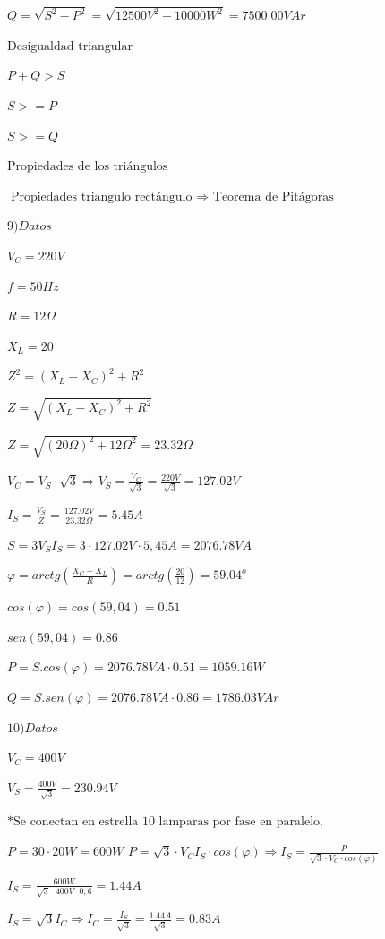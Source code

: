 $Q=\sqrt{S^2-P^2}=\sqrt{12500V^2-10000W^2} = 7500.00VAr$

$\text{Desigualdad triangular}$

$P+Q>S$

$S>=P$

$S>=Q$

$\text{Propiedades de los triángulos}$

$\text{Propiedades triangulo rectángulo $\Rightarrow$ Teorema de Pitágoras}$

\vspace{1cm}

$9) Datos$

$V_C=220V$

$f=50Hz$

$R=12 \Omega$

$X_L=20$

$Z^2=(X_L-X_C)^2+R^2 $

$Z=\sqrt{(X_L-X_C)^2+R^2} $

$Z=\sqrt{(20\Omega)^2+12\Omega^2} = 23.32\Omega$

$V_C=V_S \cdot \sqrt{3}\Rightarrow V_S=\frac{V_C}{ \sqrt{3}} =\frac{220V}{\sqrt{3}}=127.02V$

$I_S=\frac{V_S}{Z}=\frac{127.02V}{23.32\Omega}=5.45A$

$S=3 V_S I_S=3 \cdot 127.02V \cdot 5,45A=2076.78VA$

$\varphi = arctg(\frac{X_C-X_L}{R})= arctg(\frac{20}{12})=59.04^o$

$cos(\varphi) = cos(59,04)=0.51$

$sen(59,04)=0.86$

$P=S.cos(\varphi)=2076.78VA \cdot 0.51=1059.16W$

$Q=S.sen(\varphi)=2076.78VA \cdot 0.86=1786.03VAr$

\vspace{1cm}

$10)Datos$

$V_C=400V$

$V_S=\frac{400V}{\sqrt{3}}=230.94V$

$* \text{Se conectan en estrella 10 lamparas por fase en paralelo.}$

$P=30 \cdot 20W=600W $
$P=\sqrt{3}\cdot V_C I_S \cdot cos(\varphi)\Rightarrow I_S=\frac{P}{\sqrt{3}\cdot V_C \cdot cos(\varphi)}$

$I_S=\frac{600W}{\sqrt{3}\cdot 400V \cdot 0,6}=1.44A$

$I_S=\sqrt{3} I_C \Rightarrow I_C=\frac{I_S}{\sqrt{3}}=\frac{1.44A}{\sqrt{3}}=0.83A$

